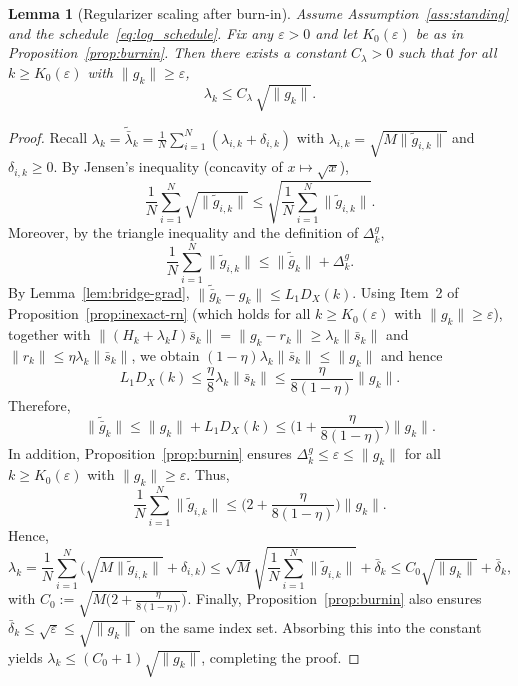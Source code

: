 \documentclass[11pt,a4paper]{article}
\newtheorem{lemma}[theorem]{Lemma}
\begin{document}
\begin{lemma}[Regularizer scaling after burn-in]\label{lem:lambda_scaling}
Assume Assumption~\ref{ass:standing} and the schedule~\eqref{eq:log_schedule}.
Fix any $\varepsilon>0$ and let $K_0(\varepsilon)$ be as in Proposition~\ref{prop:burnin}.
Then there exists a constant $C_\lambda>0$ such that for all $k\ge K_0(\varepsilon)$ with $\|g_k\|\ge \varepsilon$,
\[
\lambda_k\le C_\lambda\,\sqrt{\|g_k\|}.
\]
\end{lemma}
\begin{proof}
Recall $\lambda_k=\tilde{\bar\lambda}_k=\frac1N\sum_{i=1}^N(\lambda_{i,k}+\delta_{i,k})$ with
$\lambda_{i,k}=\sqrt{M\|\tilde g_{i,k}\|}$ and $\delta_{i,k}\ge 0$.
By Jensen's inequality (concavity of $x\mapsto\sqrt{x}$),
\[
\frac1N\sum_{i=1}^N \sqrt{\|\tilde g_{i,k}\|}
\le \sqrt{\frac1N\sum_{i=1}^N \|\tilde g_{i,k}\|}.
\]
Moreover, by the triangle inequality and the definition of $\Delta_k^g$,
\[
\frac1N\sum_{i=1}^N \|\tilde g_{i,k}\|
\le \|\tilde{\bar g}_k\|+\Delta_k^g.
\]
By Lemma~\ref{lem:bridge-grad}, $\|\tilde{\bar g}_k-g_k\|\le L_1D_X(k)$.
Using Item~2 of Proposition~\ref{prop:inexact-rn} (which holds for all $k\ge K_0(\varepsilon)$ with $\|g_k\|\ge \varepsilon$),
together with $\|(H_k+\lambda_k I)\bar s_k\|=\|g_k-r_k\|\ge \lambda_k\|\bar s_k\|$ and $\|r_k\|\le \eta\lambda_k\|\bar s_k\|$,
we obtain $(1-\eta)\lambda_k\|\bar s_k\|\le \|g_k\|$ and hence
\[
L_1D_X(k)\le \frac{\eta}{8}\lambda_k\|\bar s_k\|\le \frac{\eta}{8(1-\eta)}\|g_k\|.
\]
Therefore,
\[
\|\tilde{\bar g}_k\|\le \|g_k\|+L_1D_X(k)\le \Big(1+\frac{\eta}{8(1-\eta)}\Big)\|g_k\|.
\]
In addition, Proposition~\ref{prop:burnin} ensures $\Delta_k^g\le \varepsilon\le \|g_k\|$ for all $k\ge K_0(\varepsilon)$ with $\|g_k\|\ge \varepsilon$.
Thus,
\[
\frac1N\sum_{i=1}^N \|\tilde g_{i,k}\|
\le \Big(2+\frac{\eta}{8(1-\eta)}\Big)\|g_k\|.
\]
Hence,
\[
\lambda_k
= \frac1N\sum_{i=1}^N\big(\sqrt{M\|\tilde g_{i,k}\|}+\delta_{i,k}\big)
\le \sqrt{M}\sqrt{\frac1N\sum_{i=1}^N \|\tilde g_{i,k}\|}+\bar\delta_k
\le C_0\sqrt{\|g_k\|}+\bar\delta_k,
\]
with $C_0:=\sqrt{M\big(2+\frac{\eta}{8(1-\eta)}\big)}$.
Finally, Proposition~\ref{prop:burnin} also ensures $\bar\delta_k\le \sqrt{\varepsilon}\le \sqrt{\|g_k\|}$ on the same index set.
Absorbing this into the constant yields $\lambda_k\le (C_0+1)\sqrt{\|g_k\|}$, completing the proof.
\end{proof}
\end{document}
